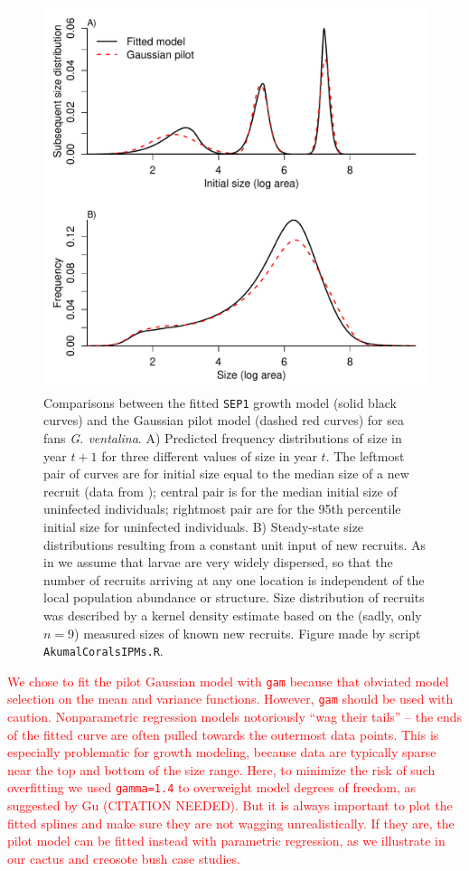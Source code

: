 \documentclass[11pt]{article}
\newcommand{\new}{\textcolor{red}}
\begin{document}
{\begin{figure}[tbp]
\centering
\includegraphics[width=.9\textwidth]{figures/CoralKernelCompare.pdf}
\caption{Comparisons between the fitted \texttt{SEP1} growth model (solid black curves) and the Gaussian pilot model (dashed red curves)
for sea fans \emph{G. ventalina}. A) Predicted frequency distributions of size in year $t+1$ for three different values of size in 
year $t$. The leftmost pair of curves are for initial size equal to the median size of a new recruit (data from \citep{bruno-etal-2011}); 
central pair is for the median initial size of uninfected individuals; rightmost pair are for the 95th percentile initial size for uninfected
individuals. B) Steady-state size distributions resulting from a constant unit input of new recruits. As in \citet{bruno-etal-2011} we
assume that larvae are very widely dispersed, so that the number of recruits arriving at any one location is independent of the local population
abundance or structure. Size distribution of recruits was described by a kernel density estimate based on the (sadly, only $n=9$) measured sizes
of known new recruits. Figure made by script \texttt{AkumalCoralsIPMs.R}.}
\label{fig:CoralKernelCompare}
\end{figure}  

\new{We chose to fit the pilot Gaussian model with \texttt{gam} because that obviated model selection on the mean and variance functions.
However, \texttt{gam} should be used with caution. Nonparametric regression models notoriously ``wag their tails'' -- the ends of the fitted curve
are often pulled towards the outermost data points. This is especially problematic for growth modeling, because data are typically 
sparse near the top and bottom of the size range. Here, to minimize the risk of such overfitting we used \texttt{gamma=1.4} to overweight
model degrees of freedom, as suggested by Gu (CITATION NEEDED). But it is always important to 
plot the fitted splines and make sure they are not wagging unrealistically. If they are, the pilot model 
can be fitted instead with parametric regression, as we illustrate in our cactus and creosote bush case studies.}


}
\end{document}
